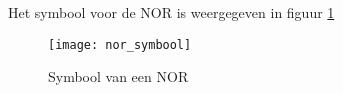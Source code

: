 Het symbool voor de NOR is weergegeven in figuur \ref{symbool:nor}

\begin{figure}[h]
\texttt{[image: nor\_symbool]}
\centering
\caption{Symbool van een NOR}
\label{symbool:nor}
\end{figure}

